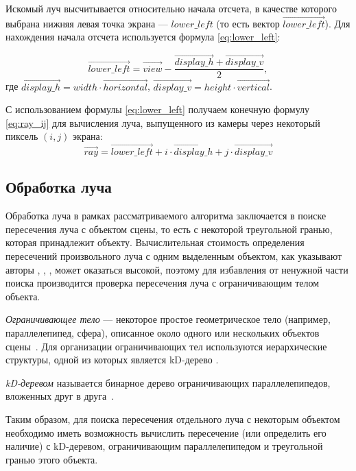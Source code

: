 Искомый луч высчитывается относительно начала отсчета, в качестве которого выбрана нижняя левая точка экрана --- $lower\_left$ (то есть вектор $\overrightarrow{lower\_left}$).
Для нахождения начала отсчета используется формула \ref{eq:lower_left}:

\begin{equation}\label{eq:lower_left}
	\overrightarrow{lower\_left} = \overrightarrow{view} - \frac{\overrightarrow{display\_h} + \overrightarrow{display\_v}}{2},
\end{equation}
где $\overrightarrow{display\_h} = width \cdot \overrightarrow{horizontal}$, $\overrightarrow{display\_v} = height \cdot \overrightarrow{vertical}$.

С использованием формулы \ref{eq:lower_left} получаем конечную формулу \ref{eq:ray_ij} для вычисления луча, выпущенного из камеры через некоторый пиксель $(i, j)$ экрана:
\begin{equation}\label{eq:ray_ij}
	\overrightarrow{ray} = \overrightarrow{lower\_left} + i \cdot \overrightarrow{display\_h} + j \cdot \overrightarrow{display\_v}
\end{equation}

\subsection{Обработка луча}

Обработка луча в рамках рассматриваемого алгоритма заключается в поиске пересечения луча с объектом сцены, то есть с некоторой треугольной гранью, которая принадлежит объекту.
Вычислительная стоимость определения пересечений произвольного луча с одним выделенным объектом, как указывают авторы \cite{божко2007компьютерная}, \cite{роджерс}, \cite{боресков}, может оказаться высокой, поэтому для избавления от ненужной части поиска производится проверка пересечения луча с ограничивающим телом объекта.

\textit{Ограничивающее тело} --- некоторое простое геометрическое тело (например, параллелепипед, сфера), описанное около одного или нескольких объектов сцены~\cite{боресков}.
Для организации ограничивающих тел используются иерархические структуры, одной из которых является kD-дерево \cite{боресков}.

\textit{kD-деревом} называется бинарное дерево ограничивающих параллелепипедов, вложенных друг в друга~\cite{боресков}.

Таким образом, для поиска пересечения отдельного луча с некоторым объектом необходимо иметь возможность вычислить пересечение (или определить его наличие) с kD-деревом, ограничивающим параллелепипедом и треугольной гранью этого объекта.

